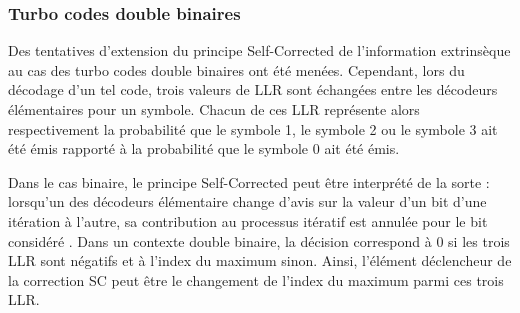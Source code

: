 \subsubsection{Turbo codes double binaires}
Des tentatives d'extension du principe Self-Corrected de l'information extrinsèque au cas des turbo codes double binaires 
ont été menées. Cependant, lors du décodage d'un tel code, trois valeurs de LLR sont échangées entre les décodeurs 
élémentaires pour un symbole. Chacun de ces LLR représente alors respectivement la probabilité que le symbole 1, le symbole 
2 ou le symbole 3 ait été émis rapporté à la probabilité que le symbole 0 ait été émis. 

Dans le cas binaire, le principe Self-Corrected peut être interprété de la sorte : \og lorsqu'un des décodeurs élémentaire 
change d'avis sur la valeur d'un bit d'une itération à l'autre, sa contribution au processus itératif est annulée pour 
le bit considéré \fg. Dans un contexte double binaire, la décision correspond à 0 si les trois LLR sont négatifs et à 
l'index du maximum sinon. Ainsi, l'élément déclencheur de la correction SC peut être le changement de l'index du maximum 
parmi ces trois LLR.

